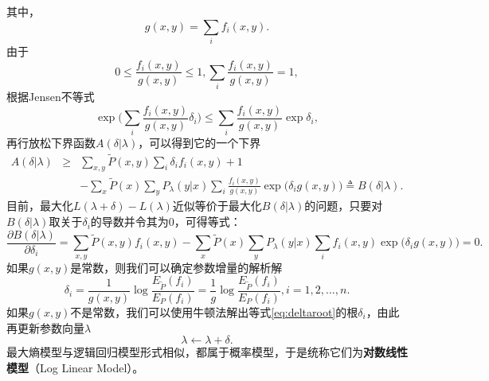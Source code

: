 其中，
\[g(x,y) = \sum\limits_i f_i(x,y).\]
由于\[0\le \frac{f_i(x,y)}{g(x,y)} \le 1, \sum\limits_i \frac{f_i(x,y)}{g(x,y)} = 1,\]
根据Jensen不等式
\begin{equation}
    \exp\Big(\sum\limits_i \frac{f_i(x,y)}{g(x,y)} \delta_i \Big) \le \sum\limits_i \frac{f_i(x,y)}{g(x,y)} \exp \delta_i,
\end{equation}
再行放松下界函数$A(\delta|\lambda)$，可以得到它的一个下界
\begin{equation}
    \begin{array}{lcl}
    A(\delta|\lambda) &\ge& \sum\limits_{x,y} \tilde P(x,y) \sum\limits_i \delta_i f_i(x,y) + 1\\
    &&-\sum\limits_x \tilde P(x) \sum\limits_y P_\lambda(y|x) \sum\limits_i \frac{f_i(x,y)}{g(x,y)} \exp\big(\delta_i g(x,y)\big) \triangleq B(\delta|\lambda).
    \end{array}
\end{equation}
目前，最大化$L(\lambda + \delta) - L(\lambda)$近似等价于最大化$B(\delta|\lambda)$的问题，只要对$B(\delta|\lambda)$取关于$\delta_i$的导数并令其为0，可得等式：
\begin{equation}\label{eq:deltaroot}
    \frac{\partial B(\delta|\lambda)}{\partial \delta_i} = \sum\limits_{x,y} \tilde P(x,y) f_i(x,y) - \sum\limits_x \tilde P(x) \sum\limits_y P_\lambda(y|x) \sum\limits_i f_i(x,y) \exp\big(\delta_i g(x,y)\big)=0.
\end{equation}
如果$g(x,y)$是常数，则我们可以确定参数增量的解析解
\begin{equation}
    \delta_i = \frac{1}{g(x,y)} \log \frac{E_{\tilde P}(f_i)}{E_P(f_i)} = \frac{1}{g} \log \frac{E_{\tilde P}(f_i)}{E_P(f_i)}, i = 1, 2, \ldots, n.
\end{equation}
如果$g(x,y)$不是常数，我们可以使用牛顿法解出等式\eqref{eq:deltaroot}的根$\delta_i$，由此再更新参数向量$\lambda$
\[\lambda \leftarrow \lambda + \delta.\]
最大熵模型与逻辑回归模型形式相似，都属于概率模型，于是统称它们为\textbf{对数线性模型}（Log Linear Model）。

